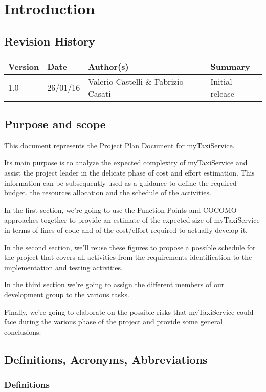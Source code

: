 \chapter{Introduction}
\section{Revision History}
\begin{center}
\begin{longtable}{|l|l|l|l|}
\hline
Version &
Date &
Author(s) &
Summary \\
\hline
1.0 &
26/01/16 &
Valerio Castelli \& Fabrizio Casati &
Initial release \\
\hline
\end{longtable}
\end{center}
\section{Purpose and scope}
This document represents the Project Plan Document for myTaxiService.

Its main purpose is to analyze the expected complexity of myTaxiService and assist the project leader in the delicate phase of cost and effort estimation. This information can be subsequently used as a guidance to define the required budget, the resources allocation and the schedule of the activities. 

In the first section, we're going to use the Function Points and COCOMO approaches together to provide an estimate of the expected size of myTaxiService in terms of lines of code and of the cost/effort required to actually develop it.

In the second section, we'll reuse these figures to propose a possible schedule for the project that covers all activities from the requirements identification to the implementation and testing activities. 

In the third section we're going to assign the different members of our development group to the various tasks.

Finally, we're going to elaborate on the possible risks that myTaxiService could face during the various phase of the project and provide some general conclusions.
\section{Definitions, Acronyms, Abbreviations}
\subsection{Definitions}
